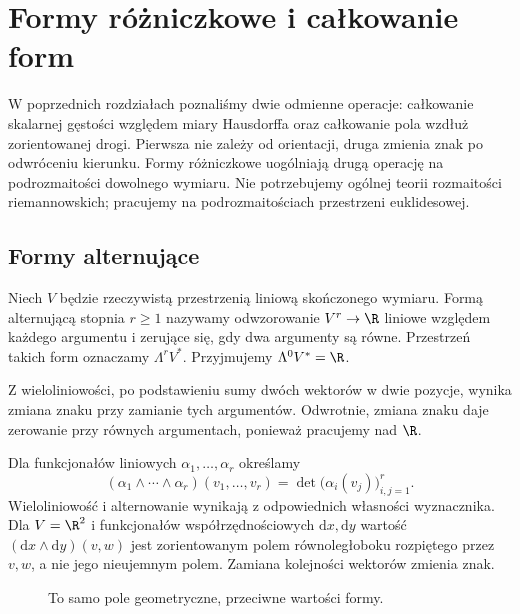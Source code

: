 \chapter{Formy różniczkowe i całkowanie form}
\label{ma2:ch:differential-forms}

W poprzednich rozdziałach poznaliśmy dwie odmienne
operacje: całkowanie skalarnej gęstości względem
miary Hausdorffa oraz całkowanie pola wzdłuż
zorientowanej drogi. Pierwsza nie zależy od orientacji,
druga zmienia znak po odwróceniu kierunku.
Formy różniczkowe uogólniają drugą operację
na podrozmaitości dowolnego wymiaru.
Nie potrzebujemy ogólnej teorii rozmaitości
riemannowskich; pracujemy na podrozmaitościach
przestrzeni euklidesowej.

\section{Formy alternujące}

\begin{definicja}
\label{ma2:def:alternating-form}
Niech $V$ będzie rzeczywistą przestrzenią liniową
skończonego wymiaru. Formą alternującą stopnia $r\ge1$
nazywamy odwzorowanie $V^r\to\R$ liniowe względem
każdego argumentu i zerujące się, gdy dwa argumenty
są równe. Przestrzeń takich form oznaczamy
$\Lambda^r V^*$. Przyjmujemy $\Lambda^0 V^*=\R$.
\end{definicja}
Z wieloliniowości, po podstawieniu sumy dwóch
wektorów w dwie pozycje, wynika zmiana znaku
przy zamianie tych argumentów. Odwrotnie,
zmiana znaku daje zerowanie przy równych argumentach,
ponieważ pracujemy nad $\R$.

Dla funkcjonałów liniowych $\alpha_1,\ldots,\alpha_r$
określamy
\[
 (\alpha_1\wedge\cdots\wedge\alpha_r)(v_1,\ldots,v_r)
 =\det\bigl(\alpha_i(v_j)\bigr)_{i,j=1}^r.
\]
Wieloliniowość i alternowanie wynikają
z odpowiednich własności wyznacznika.
Dla $V=\R^2$ i funkcjonałów współrzędnościowych
$\mathrm dx,\mathrm dy$ wartość
$(\mathrm dx\wedge\mathrm dy)(v,w)$ jest
zorientowanym polem równoległoboku rozpiętego
przez $v,w$, a nie jego nieujemnym polem.
Zamiana kolejności wektorów zmienia znak.

\begin{figure}[htbp]
\centering
{}
\caption{To samo pole geometryczne, przeciwne wartości formy.}
\label{ma2:fig:form-oriented-area}
\end{figure}

